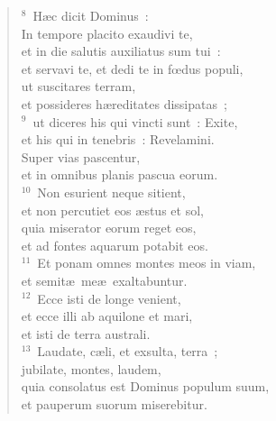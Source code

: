 \begin{verse}${}^{8}$~H\ae c dicit Dominus~:\\ In tempore placito exaudivi te,\\ et in die salutis auxiliatus sum tui~:\\ et servavi te, et dedi te in fœdus populi,\\ ut suscitares terram,\\ et possideres h\ae reditates dissipatas~;\\
${}^{9}$~ut diceres his qui vincti sunt~: Exite,\\ et his qui in tenebris~: Revelamini.\\ Super vias pascentur,\\ et in omnibus planis pascua eorum.\\
${}^{10}$~Non esurient neque sitient,\\ et non percutiet eos \ae stus et sol,\\ quia miserator eorum reget eos,\\ et ad fontes aquarum potabit eos.\\
${}^{11}$~Et ponam omnes montes meos in viam,\\ et semit\ae\ me\ae\ exaltabuntur.\\
${}^{12}$~Ecce isti de longe venient,\\ et ecce illi ab aquilone et mari,\\ et isti de terra australi.\\
${}^{13}$~Laudate, c\ae li, et exsulta, terra~;\\ jubilate, montes, laudem,\\ quia consolatus est Dominus populum suum,\\ et pauperum suorum miserebitur.\end{verse}


